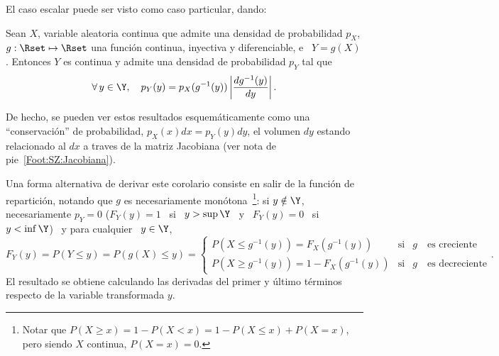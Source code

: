 El caso escalar puede ser visto como caso particular, dando:
%
\begin{corolario}
\label{Cor:MP:TransformacionInyectivaDensidadEscalar}
%
  Sean $X$, variable aleatoria continua  que admite una densidad de probabilidad
  $p_X$,   $g:\Rset  \mapsto   \Rset$  una   funci\'on  continua,   inyectiva  y
  diferenciable, e \ $Y = g(X)$.  Entonces $Y$ es continua y admite una densidad
  de probabilidad $p_Y$ tal que
  \[
  \forall  \,   y  \in  \Y,   \quad  p_Y(y)  =  p_X(g^{-1}(y))   \left|  \frac{d
      g^{-1}(y)}{dy} \right|.
  \]
\end{corolario}
%
\noindent De hecho,  se pueden ver estos resultados  esquem\'aticamente como una
``conservaci\'on'' de  probabilidad, $p_X(x)  dx = p_Y(y)  dy$, el  volumen $dy$
estando  relacionado al  $dx$  a traves  de  la matriz  Jacobiana  (ver nota  de
pie~\ref{Foot:SZ:Jacobiana}).

Una  forma  alternativa  de derivar  este  corolario  consiste  en salir  de  la
funci\'on    de    repartici\'on,   notando    que    $g$   es    necesariamente
mon\'otona~\footnote{Notar que $P(X \ge x) = 1 - P(X < x) = 1 - P(X \le x) + P(X
  =  x)$, pero  siendo $X$  continua, $  P(X =  x) =  0$.}: si  $y  \notin \Y$,
necesariamente $p_Y = 0$ ($F_Y(y) = 1$ \ si \ $y > \sup \Y$ \ y \ $F_Y(y) = 0$ \
si \ $y < \inf \Y$) \ y para cualquier \ $y \in \Y$,
%
\[
F_Y(y) = P(Y \le y) = P(g(X) \le y) =
\left\{\begin{array}{lll}
P(X \le g^{-1}(y)) = F_X(g^{-1}(y)) & \mbox{si} & g \quad \mbox{es creciente}\\[2.5mm]
%
P(X \ge g^{-1}(y)) = 1 - F_X(g^{-1}(y)) & \mbox{si} & g \quad \mbox{es decreciente}
\end{array}\right..
\]
%
El  resultado  se  obtiene  calculando  las  derivadas  del  primer  y  \'ultimo
t\'erminos respecto de la variable transformada $y$.

